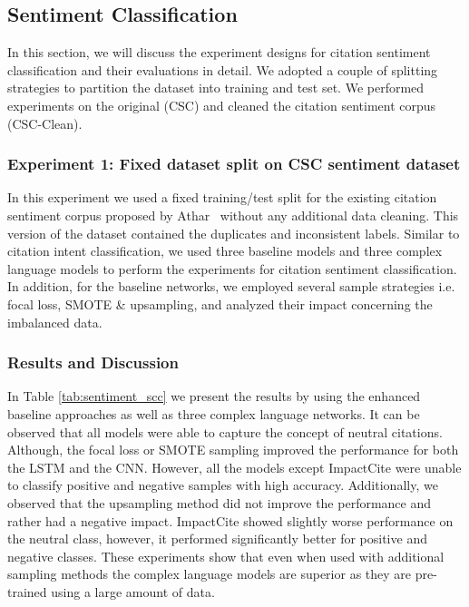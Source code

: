 \documentclass[runningheads]{llncs}
\begin{document}
\subsection{Sentiment Classification}
In this section, we will discuss the experiment designs for citation sentiment classification and their evaluations in detail. We adopted a couple of splitting strategies to partition the dataset into training and test set. We performed experiments on the original (CSC) and cleaned the citation sentiment corpus (CSC-Clean).

\subsubsection{Experiment 1: Fixed dataset split on CSC sentiment dataset}
In this experiment we used a fixed  training/test split for the existing citation sentiment corpus proposed by Athar~\cite{athar:2011:SS} without any additional data cleaning. This version of the dataset contained the duplicates and inconsistent labels. Similar to citation intent classification, we used three baseline models and three complex language models to perform the experiments for citation sentiment classification. In addition, for the baseline networks, we employed several sample strategies i.e. focal loss, SMOTE \& upsampling, and analyzed their impact concerning the imbalanced data.

\subsubsection{Results and Discussion}
In Table \ref{tab:sentiment_scc} we present the results by using the enhanced baseline approaches as well as three complex language networks. It can be observed that all models were able to capture the concept of neutral citations. Although, the focal loss or SMOTE sampling improved the performance for both the LSTM and the CNN. However, all the models except ImpactCite were unable to classify positive and negative samples with high accuracy. Additionally, we observed that the upsampling method did not improve the performance and rather had a negative impact. ImpactCite showed slightly worse performance on the neutral class, however, it performed significantly better for positive and negative classes. These experiments show that even when used with additional sampling methods the complex language models are superior as they are pre-trained using a large amount of data.
\end{document}
